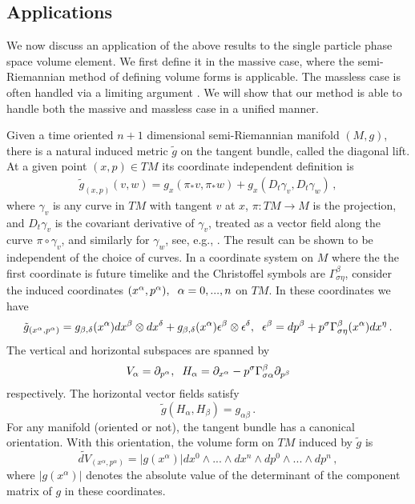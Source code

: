 \subsection{Applications}
We now discuss an application of the above results to the single particle phase space volume element. We first define it in the massive case, where the semi-Riemannian method of defining volume forms is applicable.  The massless case is often handled via a limiting argument \cite{tsamparlis}.  We will show that   our method is able to handle both the massive and massless case in a unified manner.

 Given a time oriented $n+1$ dimensional semi-Riemannian manifold $(M,g)$, there is a natural induced metric $\tilde{g}$ on the tangent bundle, called the diagonal lift.  At a given point $(x,p)\in TM$ its coordinate independent definition is
\begin{align}
\tilde{g}_{(x,p)}(v,w)=g_x(\pi_{*} v,\pi_{*} w)+g_x(D_t \gamma_v, D_t \gamma_w)\,,
\end{align}
where $\gamma_v$ is any curve in $TM$ with tangent $v$ at $x$, $\pi:TM\longrightarrow M$ is the projection, and $D_t\gamma_v$ is the covariant derivative of $\gamma_v$, treated as a vector field along the curve $\pi\circ\gamma_v$, and similarly for $\gamma_w$, see, e.g., \cite{pettini}. The result can be shown to be independent of the choice of curves.  In a coordinate system on $M$ where the the first coordinate is future timelike and the Christoffel symbols are $\Gamma^\beta_{\sigma\eta}$, consider the  induced coordinates $(x^\alpha,p^\alpha), \hspace{2mm}\alpha=0,...,n$ on $TM$.  In these coordinates we have 
\begin{equation}
\tilde{g}_{(x^\alpha,p^\alpha)}=g_{\beta,\delta}(x^\alpha)dx^\beta\otimes dx^\delta +g_{\beta,\delta}(x^{\alpha})\epsilon^\beta\otimes \epsilon^\delta, \hspace{2mm} \epsilon^\beta=dp^\beta+p^\sigma\Gamma^\beta_{\sigma\eta}(x^{\alpha})dx^\eta\,.
\end{equation}
The vertical and horizontal subspaces are spanned by
\begin{equation}\label{horizontalSubspace}
V_\alpha=\partial_{p^\alpha}, \hspace{2mm} H_\alpha=\partial_{x^\alpha}-p^\sigma\Gamma_{\sigma\alpha}^\beta\partial_{p^\beta}
\end{equation}
respectively.  The horizontal vector fields satisfy
\begin{equation}
\tilde{g}(H_\alpha,H_\beta)=g_{\alpha\beta}\,.
\end{equation}
For any manifold (oriented or not), the tangent bundle has a canonical orientation.  With this orientation, the volume form on $TM$ induced by $\tilde{g}$ is
\begin{equation}
\widetilde{dV}_{(x^\alpha,p^{\alpha})}=|g(x^\alpha)|dx^0\wedge...\wedge dx^n\wedge dp^0\wedge...\wedge dp^n\,,
\end{equation}
where $|g(x^\alpha)|$ denotes the absolute value of the determinant of the component matrix of $g$ in these coordinates.

